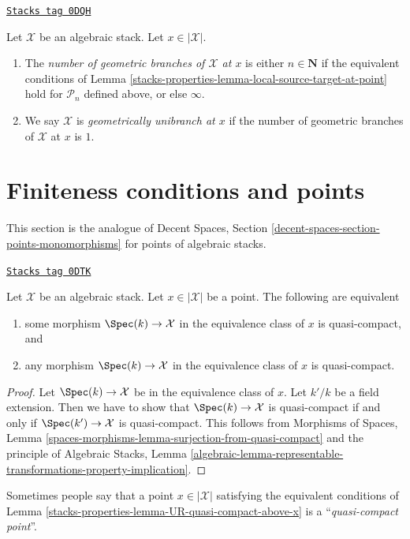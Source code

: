 \begin{definition}
\label{stacks-properties-definition-number-of-geometric-branches}
\href{https://stacks.math.columbia.edu/tag/0DQH}{\texttt{Stacks tag 0DQH}}

Let $\mathcal{X}$ be an algebraic stack. Let $x \in |\mathcal{X}|$.
\begin{enumerate}
\item The {\it number of geometric branches of $\mathcal{X}$ at $x$}
is either $n \in \mathbf{N}$ if the equivalent conditions of
Lemma \ref{stacks-properties-lemma-local-source-target-at-point} hold for
$\mathcal{P}_n$ defined above, or else $\infty$.
\item We say $\mathcal{X}$ is {\it geometrically unibranch at $x$}
if the number of geometric branches of $\mathcal{X}$ at $x$ is $1$.
\end{enumerate}
\end{definition}

\section{Finiteness conditions and points}
\label{stacks-properties-section-points-conditions}
This section is the analogue of
Decent Spaces, Section \ref{decent-spaces-section-points-monomorphisms}
for points of algebraic stacks.

\begin{lemma}
\label{stacks-properties-lemma-UR-quasi-compact-above-x}
\href{https://stacks.math.columbia.edu/tag/0DTK}{\texttt{Stacks tag 0DTK}}

Let $\mathcal{X}$ be an algebraic stack. Let $x \in |\mathcal{X}|$
be a point. The following are equivalent
\begin{enumerate}
\item some morphism $\Spec(k) \to \mathcal{X}$ in the equivalence
class of $x$ is quasi-compact, and
\item any morphism $\Spec(k) \to \mathcal{X}$ in the equivalence
class of $x$ is quasi-compact.
\end{enumerate}
\end{lemma}

\begin{proof}
Let $\Spec(k) \to \mathcal{X}$ be in the equivalence
class of $x$. Let $k'/k$ be a field extension.
Then we have to show that $\Spec(k) \to \mathcal{X}$ is
quasi-compact if and only if $\Spec(k') \to \mathcal{X}$
is quasi-compact. This follows from
Morphisms of Spaces, Lemma
\ref{spaces-morphisms-lemma-surjection-from-quasi-compact}
and the principle of Algebraic Stacks, Lemma
\ref{algebraic-lemma-representable-transformations-property-implication}.
\end{proof}

Sometimes people say that a point $x \in |\mathcal{X}|$ satisfying
the equivalent conditions of Lemma \ref{stacks-properties-lemma-UR-quasi-compact-above-x}
is a ``{\it quasi-compact point}''.



